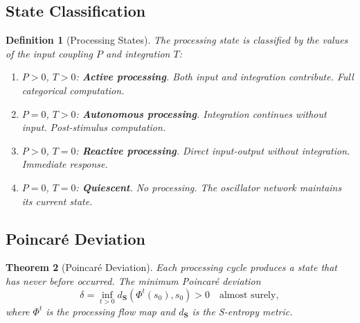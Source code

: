\documentclass[twocolumn,10pt]{article}
\newtheorem{theorem}{Theorem}[section]
\newtheorem{definition}[theorem]{Definition}
\theoremstyle{remark}
\newcommand{\Scoord}{\mathbf{S}}
\begin{document}
\subsection{State Classification}

\begin{definition}[Processing States]
\label{def:states}
The processing state is classified by the values of the input coupling $P$ and integration $T$:
\begin{enumerate}
\item $P > 0$, $T > 0$: \textbf{Active processing}. Both input and integration contribute. Full categorical computation.
\item $P = 0$, $T > 0$: \textbf{Autonomous processing}. Integration continues without input. Post-stimulus computation.
\item $P > 0$, $T = 0$: \textbf{Reactive processing}. Direct input-output without integration. Immediate response.
\item $P = 0$, $T = 0$: \textbf{Quiescent}. No processing. The oscillator network maintains its current state.
\end{enumerate}
\end{definition}

\subsection{Poincar\'e Deviation}

\begin{theorem}[Poincar\'e Deviation]
\label{thm:poincare}
Each processing cycle produces a state that has never before occurred. The minimum Poincar\'e deviation
\begin{equation}
\delta = \inf_{t > 0} d_{\Scoord}(\Phi^t(s_0), s_0) > 0 \quad \text{almost surely},
\label{eq:poincare_dev}
\end{equation}
where $\Phi^t$ is the processing flow map and $d_{\Scoord}$ is the S-entropy metric.
\end{theorem}
\end{document}
